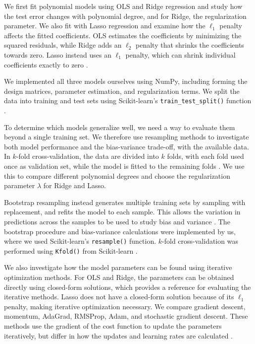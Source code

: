 \documentclass[amssymb,twocolumn,aps]{revtex4}
\begin{document}
We first fit polynomial models using OLS and Ridge regression and study how the test error changes with polynomial degree, and for Ridge, the regularization parameter. We also fit with Lasso regression and examine how the $\ell_1$ penalty affects the fitted coefficients. OLS estimates the coefficients by minimizing the squared residuals, while Ridge adds an $\ell_2$ penalty that shrinks the coefficients towards zero. Lasso instead uses an $\ell_1$ penalty, which can shrink individual coefficients exactly to zero \cite{hastie}.

We implemented all three models ourselves using NumPy\cite{numpy}, including forming the design matrices, parameter estimation, and regularization terms. We split the data into training and test sets using Scikit-learn's \texttt{train\_test\_split()} function \cite{scikit-learn}.

To determine which models generalize well, we need a way to evaluate them beyond a single training set. We therefore use resampling methods to investigate both model performance and the bias-variance trade-off, with the available data. In $k$-fold cross-validation, the data are divided into $k$ folds, with each fold used once as validation set, while the model is fitted to the remaining folds \cite{hastie}. We use this to compare different polynomial degrees and choose the regularization parameter $\lambda$ for Ridge and Lasso.

Bootstrap resampling instead generates multiple training sets by sampling with replacement, and refits the model to each sample. This allows the variation in predictions across the samples to be used to study bias and variance \cite{hastie}. The bootstrap procedure and bias-variance calculations were implemented by us, where we used Scikit-learn's \texttt{resample()} function. $k$-fold cross-validation was performed using \texttt{Kfold()} from Scikit-learn \cite{scikit-learn}.

We also investigate how the model parameters can be found using iterative optimization methods. For OLS and Ridge, the parameters can be obtained directly using closed-form solutions, which provides a reference for evaluating the iterative methods. Lasso does not have a closed-form solution because of its $\ell_1$ penalty, making iterative optimization necessary. We compare gradient descent, momentum, AdaGrad, RMSProp, Adam, and stochastic gradient descent. These methods use the gradient of the cost function to update the parameters iteratively, but differ in how the updates and learning rates are calculated \cite{lecturebook}.
\end{document}
